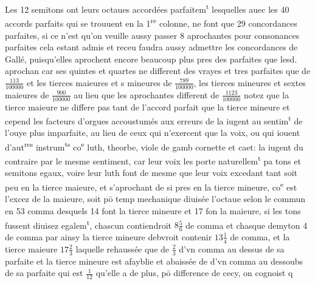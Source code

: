\documentclass[11pt,a4paper]{article}
\begin{document}
Les 12 semitons ont leurs octaues accordées parfaitem\textsuperscript{t} lesquelles auec les 40 accords parfaits qui se trouuent en la 1\textsuperscript{re} colonne, ne font que 29 concordances parfaites, si ce n'est qu'on veuille aussy passer 8 aprochantes pour consonances  parfaites cela estant admis et receu faudra aussy admettre les concordances de Gallé, puisqu'elles aprochent encore beaucoup plus pres des parfaites que lesd. aprochan car ses quintes et quartes ne different des vrayes et tres parfaites que de $\frac{113}{100000}$ et les tierces maieures et s mineures de $\frac{789}{100000}$, les tierces mineures et sextes maieures de $\frac{900}{100000}$ au lieu que les aprochantes different de $\frac{1123}{100000}$ notez que la tierce maieure ne differe pas tant de l'accord parfait que la tierce mineure et cepend les facteurs d'orgues accoustumés aux erreurs de \ill{} la iugent au sentim\textsuperscript{t} de l'ouye plus imparfaite, au lieu de ceux qui n'exercent que la voix, ou qui iouent d'aut\textsuperscript{res} instrum\textsuperscript{ts} co\textsuperscript{e} luth, theorbe, viole de gamb cornette et caet: la iugent du contraire par le mesme sentiment, car leur voix les porte naturellem\textsuperscript{t} pa tons et semitons egaux, voire leur luth font de mesme que leur voix excedant tant soit peu en la tierce maieure, et s'aprochant de si pres en la tierce mineure, co\textsuperscript{e} est l'excez de la maieure, soit pō  temp\ill{} mechanique diuisée l'octaue selon le commun en 53 comma desquels 14 font la tierce mineure et 17 fon la maieure, si les tons fussent diuisez egalem\textsuperscript{t}, chascun contiendroit $8\frac{5}{6}$ de comma et chasque demyton 4\ill{} de comma par ainsy la tierce mineure debvroit contenir $13\frac{1}{4}$ de comma, et la tierce maieure $17\frac{2}{3}$ laquelle \ill{} rehaussée que de $\frac{2}{3}$ d'vn comma au dessus de sa parfaite et la tierce mineure est afayblie et abaissée de \ill{} d'vn comma au dessoubs de sa parfaite qui est $\frac{1}{12}$ qu'elle a de plus, pō difference de cecy, on cognoist q\ill{}
\end{document}
